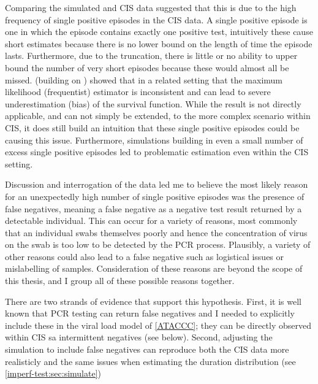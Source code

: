 \documentclass[thesis.tex]{subfiles}
\begin{document}
Comparing the simulated and CIS data suggested that this is due to the high frequency of single positive episodes in the CIS data.
A single positive episode is one in which the episode contains exactly one positive test, intuitively these cause short estimates because there is no lower bound on the length of time the episode lasts.
Furthermore, due to the truncation, there is little or no ability to upper bound the number of very short episodes because these would almost all be missed.
\Textcite{shenNonparametrica} (building on \textcite{panNote}) showed that in a related setting that the maximum likelihood (frequentist) estimator is inconsistent and can lead to severe underestimation (bias) of the survival function.
While the result is not directly applicable, and can not simply be extended, to the more complex scenario within CIS, it does still build an intuition that these single positive episodes could be causing this issue.
Furthermore, simulations building in even a small number of excess single positive episodes led to problematic estimation even within the CIS setting.

Discussion and interrogation of the data led me to believe the most likely reason for an unexpectedly high number of single positive episodes was the presence of false negatives, meaning a false negative as a negative test result returned by a detectable individual.
This can occur for a variety of reasons, most commonly that an individual swabs themselves poorly and hence the concentration of virus on the swab is too low to be detected by the PCR process.
Plausibly, a variety of other reasons could also lead to a false negative such as logistical issues or mislabelling of samples.
Consideration of these reasons are beyond the scope of this thesis, and I group all of these possible reasons together.

There are two strands of evidence that support this hypothesis.
First, it is well known that PCR testing can return false negatives  and I needed to explicitly include these in the viral load model of \cref{ATACCC}; they can be directly observed within CIS sa intermittent negatives (see below).
Second, adjusting the simulation to include false negatives can reproduce both the CIS data more realisticly and the same issues when estimating the duration distribution (see \cref{imperf-test:sec:simulate})
\end{document}
